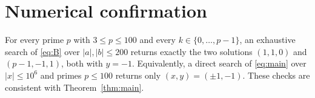 \documentclass{amsart}
\theoremstyle{definition}
\begin{document}
\section{Numerical confirmation}

For every prime $p$ with $3\le p\le100$ and every $k\in\{0,\dots,p-1\}$, an
exhaustive search of \eqref{eq:B} over $|a|,|b|\le 200$ returns exactly the two
solutions $(1,1,0)$ and $(p-1,-1,1)$, both with $y=-1$. Equivalently, a direct
search of \eqref{eq:main} over $|x|\le 10^6$ and primes $p\le 100$ returns only
$(x,y)=(\pm1,-1)$. These checks are consistent with Theorem~\ref{thm:main}.
\end{document}
